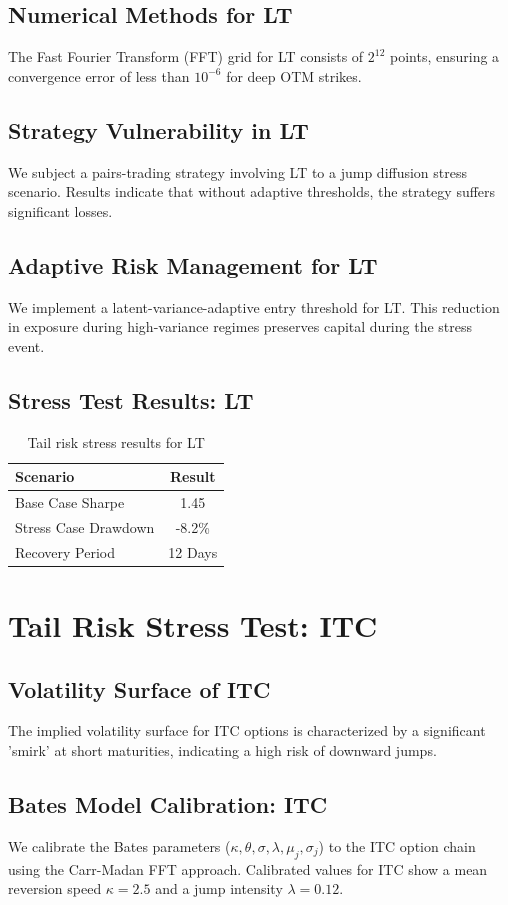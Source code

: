 \documentclass[12pt,a4paper,twoside]{article}
\begin{document}
\subsection{Numerical Methods for LT}
The Fast Fourier Transform (FFT) grid for LT consists of $2^{12}$ points, ensuring a convergence error of less than $10^{-6}$ for deep OTM strikes.
\subsection{Strategy Vulnerability in LT}
We subject a pairs-trading strategy involving LT to a jump diffusion stress scenario. Results indicate that without adaptive thresholds, the strategy suffers significant losses.
\subsection{Adaptive Risk Management for LT}
We implement a latent-variance-adaptive entry threshold for LT. This reduction in exposure during high-variance regimes preserves capital during the stress event.
\subsection{Stress Test Results: LT}
\begin{table}[H]
\centering
\begin{tabular}{|l|c|}
\hline
Scenario & Result \\
\hline
Base Case Sharpe & 1.45 \\
Stress Case Drawdown & -8.2\% \\
Recovery Period & 12 Days \\
\hline
\end{tabular}
\caption{Tail risk stress results for LT}
\end{table}
\newpage

\section{Tail Risk Stress Test: ITC}
\subsection{Volatility Surface of ITC}
The implied volatility surface for ITC options is characterized by a significant 'smirk' at short maturities, indicating a high risk of downward jumps.
\subsection{Bates Model Calibration: ITC}
We calibrate the Bates parameters ($\kappa, \theta, \sigma, \lambda, \mu_j, \sigma_j$) to the ITC option chain using the Carr-Madan FFT approach.
Calibrated values for ITC show a mean reversion speed $\kappa = 2.5$ and a jump intensity $\lambda = 0.12$.
\end{document}
